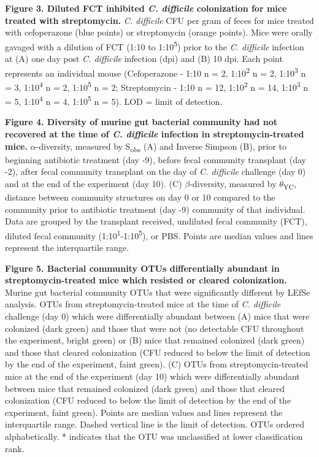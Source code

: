 \documentclass[
  12pt,
]{article}
\begin{document}
\hfill\break

\textbf{Figure 3. Diluted FCT inhibited \emph{C. difficile} colonization
for mice treated with streptomycin.} \emph{C. difficile} CFU per gram of
feces for mice treated with cefoperazone (blue points) or streptomycin
(orange points). Mice were orally gavaged with a dilution of FCT (1:10
to 1:10\textsuperscript{5}) prior to the \emph{C. difficile} infection
at (A) one day post \emph{C. difficile} infection (dpi) and (B) 10 dpi.
Each point represents an individual mouse (Cefoperazone - 1:10 n = 2,
1:10\textsuperscript{2} n = 2, 1:10\textsuperscript{3} n = 3,
1:10\textsuperscript{4} n = 2, 1:10\textsuperscript{5} n = 2;
Streptomycin - 1:10 n = 12, 1:10\textsuperscript{2} n = 14,
1:10\textsuperscript{3} n = 5, 1:10\textsuperscript{4} n = 4,
1:10\textsuperscript{5} n = 5). LOD = limit of detection.

\hfill\break

\textbf{Figure 4. Diversity of murine gut bacterial community had not
recovered at the time of \emph{C. difficile} infection in
streptomycin-treated mice.} \(\alpha\)-diversity, measured by
S\textsubscript{obs} (A) and Inverse Simpson (B), prior to beginning
antibiotic treatment (day -9), before fecal community transplant (day
-2), after fecal community transplant on the day of \emph{C. difficile}
challenge (day 0) and at the end of the experiment (day 10). (C)
\(\beta\)-diversity, measured by \(\theta\)\textsubscript{YC}, distance
between community structures on day 0 or 10 compared to the community
prior to antibiotic treatment (day -9) community of that individual.
Data are grouped by the transplant received, undiluted fecal community
(FCT), diluted fecal community
(1:10\textsuperscript{1}-1:10\textsuperscript{5}), or PBS. Points are
median values and lines represent the interquartile range.

\hfill\break

\textbf{Figure 5. Bacterial community OTUs differentially abundant in
streptomycin-treated mice which resisted or cleared colonization.}
Murine gut bacterial community OTUs that were significantly different by
LEfSe analysis. OTUs from streptomycin-treated mice at the time of
\emph{C. difficile} challenge (day 0) which were differentially abundant
between (A) mice that were colonized (dark green) and those that were
not (no detectable CFU throughout the experiment, bright green) or (B)
mice that remained colonized (dark green) and those that cleared
colonization (CFU reduced to below the limit of detection by the end of
the experiment, faint green). (C) OTUs from streptomycin-treated mice at
the end of the experiment (day 10) which were differentially abundant
between mice that remained colonized (dark green) and those that cleared
colonization (CFU reduced to below the limit of detection by the end of
the experiment, faint green). Points are median values and lines
represent the interquartile range. Dashed vertical line is the limit of
detection. OTUs ordered alphabetically. * indicates that the OTU was
unclassified at lower classification rank.
\end{document}
